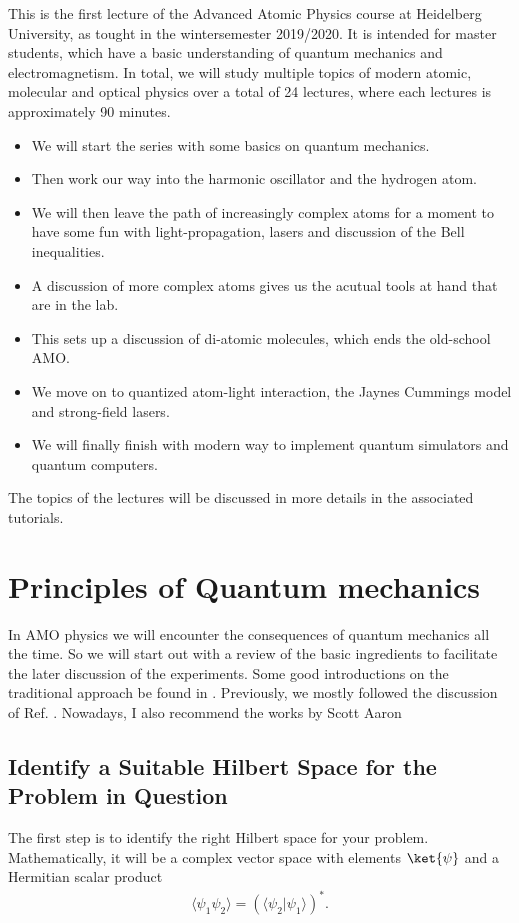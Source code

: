 This is the first lecture of the Advanced Atomic Physics course at Heidelberg University, as tought in the wintersemester 2019/2020.
It is intended for master students, which have a basic understanding of quantum mechanics and electromagnetism. In total, we will study multiple topics of modern atomic, molecular and optical physics over a total of 24 lectures, where each lectures is approximately 90 minutes. 
\begin{itemize}
\item We will start the series with some basics on quantum mechanics.
\item Then work our way into the harmonic oscillator and the hydrogen atom.
\item We will then leave the path of increasingly complex atoms for a moment to have some fun with light-propagation, lasers and discussion of the Bell inequalities.
\item A discussion of more complex atoms gives us the acutual tools at hand that are in the lab.
\item This sets up a discussion of di-atomic molecules, which ends the old-school AMO.
\item We move on to quantized atom-light interaction, the Jaynes Cummings model and strong-field lasers.
\item We will finally finish with modern way to implement quantum simulators and quantum computers.
\end{itemize}

The topics of the lectures will be discussed in more details in the associated tutorials. 

\section{Principles of Quantum mechanics}
In AMO physics we will encounter the consequences of quantum mechanics all the time. So we will start out with a review of the basic ingredients to facilitate the later discussion of the experiments. 
Some good introductions on the traditional approach be found in \cite{2002, 2006} \cite{1}\cite{2}. Previously, we mostly followed the discussion of Ref. \cite{2006}. Nowadays, I also recommend the works by Scott Aaron

\subsection{Identify a Suitable Hilbert Space for the Problem in Question}
The first step is to identify the right Hilbert space for your problem. Mathematically, it will be a complex vector space with elements $\ket{\psi}$ and a Hermitian scalar product
\begin{align}
				\langle\psi_1 \psi_2\rangle=(\langle{\psi_2}| \psi_1\rangle)^*.
\end{align}

